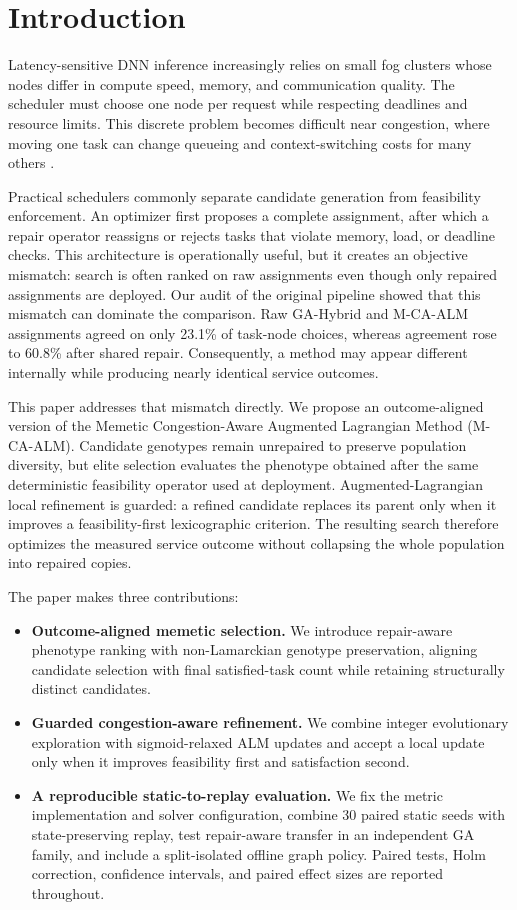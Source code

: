 \section{Introduction}

Latency-sensitive DNN inference increasingly relies on small fog clusters whose nodes differ in compute speed, memory, and communication quality. The scheduler must choose one node per request while respecting deadlines and resource limits. This discrete problem becomes difficult near congestion, where moving one task can change queueing and context-switching costs for many others \cite{Mao2017}.

Practical schedulers commonly separate candidate generation from feasibility enforcement. An optimizer first proposes a complete assignment, after which a repair operator reassigns or rejects tasks that violate memory, load, or deadline checks. This architecture is operationally useful, but it creates an objective mismatch: search is often ranked on raw assignments even though only repaired assignments are deployed. Our audit of the original pipeline showed that this mismatch can dominate the comparison. Raw GA-Hybrid and M-CA-ALM assignments agreed on only 23.1\% of task-node choices, whereas agreement rose to 60.8\% after shared repair. Consequently, a method may appear different internally while producing nearly identical service outcomes.

This paper addresses that mismatch directly. We propose an outcome-aligned version of the Memetic Congestion-Aware Augmented Lagrangian Method (M-CA-ALM). Candidate genotypes remain unrepaired to preserve population diversity, but elite selection evaluates the phenotype obtained after the same deterministic feasibility operator used at deployment. Augmented-Lagrangian local refinement is guarded: a refined candidate replaces its parent only when it improves a feasibility-first lexicographic criterion. The resulting search therefore optimizes the measured service outcome without collapsing the whole population into repaired copies.

The paper makes three contributions:
\begin{itemize}
    \item \textbf{Outcome-aligned memetic selection.} We introduce repair-aware phenotype ranking with non-Lamarckian genotype preservation, aligning candidate selection with final satisfied-task count while retaining structurally distinct candidates.
    \item \textbf{Guarded congestion-aware refinement.} We combine integer evolutionary exploration with sigmoid-relaxed ALM updates and accept a local update only when it improves feasibility first and satisfaction second.
    \item \textbf{A reproducible static-to-replay evaluation.} We fix the metric implementation and solver configuration, combine 30 paired static seeds with state-preserving replay, test repair-aware transfer in an independent GA family, and include a split-isolated offline graph policy. Paired tests, Holm correction, confidence intervals, and paired effect sizes are reported throughout.
\end{itemize}

